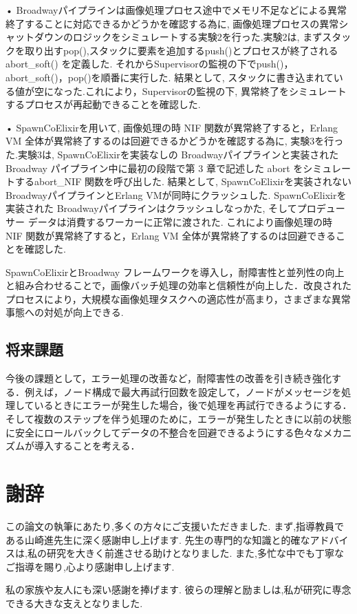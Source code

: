 \documentclass[a4paper]{jreport}	%
\begin{document}
• Broadwayパイプラインは画像処理プロセス途中でメモリ不足などによる異常終了することに対応できるかどうかを確認する為に, 画像処理プロセスの異常シャットダウンのロジックをシミュレートする実験2を行った.実験2は, まずスタックを取り出すpop(),スタックに要素を追加するpush()とプロセスが終了されるabort\_soft() を定義した. それからSupervisorの監視の下でpush()，abort\_soft()，pop()を順番に実行した. 結果として, スタックに書き込まれている値が空になった.これにより，Supervisorの監視の下, 異常終了をシミュレートするプロセスが再起動できることを確認した. 

• SpawnCoElixirを用いて, 画像処理の時 NIF 関数が異常終了すると，Erlang VM 全体が異常終了するのは回避できるかどうかを確認する為に, 実験3を行った.実験3は, SpawnCoElixirを実装なしの Broadwayパイプラインと実装された Broadway パイプライン中に最初の段階で第 3 章で記述した abort をシミュレートするabort\_NIF 関数を呼び出した. 結果として, SpawnCoElixirを実装されないBroadwayパイプラインとErlang VMが同時にクラッシュした. SpawnCoElixirを実装された Broadwayパイプラインはクラッシュしなっかた, そしてプロデューサー データは消費するワーカーに正常に渡された. これにより画像処理の時 NIF 関数が異常終了すると，Erlang VM 全体が異常終了するのは回避できることを確認した.

SpawnCoElixirとBroadway フレームワークを導入し，耐障害性と並列性の向上と組み合わせることで，画像バッチ処理の効率と信頼性が向上した．改良されたプロセスにより，大規模な画像処理タスクへの適応性が高まり，さまざまな異常事態への対処が向上できる.
\section{将来課題}
今後の課題として，エラー処理の改善など，耐障害性の改善を引き続き強化する．例えば，ノード構成で最大再試行回数を設定して，ノードがメッセージを処理しているときにエラーが発生した場合，後で処理を再試行できるようにする．そして複数のステップを伴う処理のために，エラーが発生したときに以前の状態に安全にロールバックしてデータの不整合を回避できるようにする色々なメカニズムが導入することを考える．
\chapter*{謝辞}
この論文の執筆にあたり,多くの方々にご支援いただきました. まず,指導教員である山崎進先生に深く感謝申し上げます. 先生の専門的な知識と的確なアドバイスは,私の研究を大きく前進させる助けとなりました. また,多忙な中でも丁寧なご指導を賜り,心より感謝申し上げます. 

私の家族や友人にも深い感謝を捧げます. 彼らの理解と励ましは,私が研究に専念できる大きな支えとなりました. 
\end{document}
